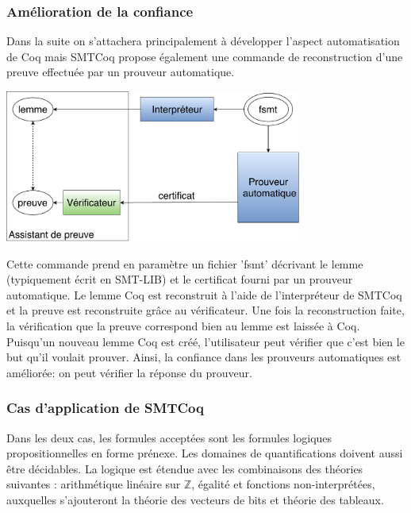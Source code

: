 \documentclass[11pt]{article}
\begin{document}
\subsubsection{Amélioration de la confiance} \label{confiance}

Dans la suite on s'attachera principalement à développer l'aspect automatisation de Coq mais SMTCoq propose également une commande de reconstruction d'une preuve effectuée par un prouveur automatique.

\begin{center}
\includegraphics[height=5cm]{Confiance.pdf}
\end{center}

Cette commande prend en paramètre un fichier 'fsmt' décrivant le lemme (typiquement écrit en SMT-LIB) et le certificat fourni par un prouveur automatique. Le lemme Coq est reconstruit à l'aide de l'interpréteur de SMTCoq et la preuve est reconstruite grâce au vérificateur. Une fois la reconstruction faite, la vérification que la preuve correspond bien au lemme est laissée à Coq. \\

Puisqu'un nouveau lemme Coq est créé, l'utilisateur peut vérifier que c'est bien le but qu'il voulait prouver. Ainsi, la confiance dans les prouveurs automatiques est améliorée: on peut vérifier la réponse du prouveur.


\subsubsection{Cas d'application de SMTCoq}

Dans les deux cas, les formules acceptées sont les formules logiques propositionnelles en forme prénexe. Les domaines de quantifications doivent aussi être décidables. La logique est étendue avec les combinaisons des théories suivantes : arithmétique linéaire sur $\mathbb{Z}$, égalité et fonctions non-interprétées, auxquelles s'ajouteront la théorie des vecteurs de bits et théorie des tableaux. 
\end{document}

